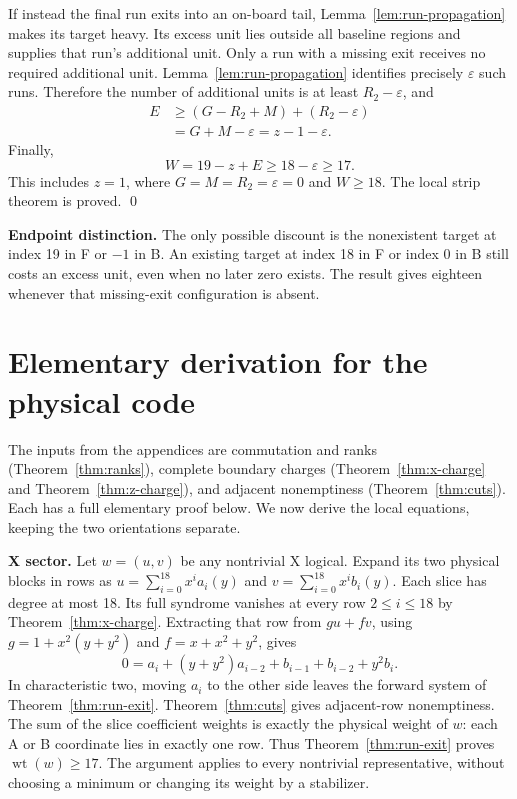 \documentclass{article}
\DeclareMathOperator{\wt}{wt}
\begin{document}
If instead the final run exits into an on-board tail, Lemma~\ref{lem:run-propagation} makes
its target heavy. Its excess unit lies outside all baseline regions and supplies
that run's additional unit. Only a run with a missing exit receives no
required additional unit. Lemma~\ref{lem:run-propagation} identifies precisely
\(\varepsilon\) such runs. Therefore the number of additional units is at least
\(R_2 - \varepsilon\), and
\begin{equation}
  \begin{aligned}
    E &\ge (G - R_2 + M) + (R_2 - \varepsilon) \\
      &= G + M - \varepsilon = z - 1 - \varepsilon.
  \end{aligned}
\end{equation}
Finally,
\begin{equation}
  W = 19 - z + E \ge 18 - \varepsilon \ge 17.
\end{equation}
This includes \(z = 1\), where \(G = M = R_2 = \varepsilon = 0\) and \(W \ge 18\).
The local strip theorem is proved. \qed

\textbf{Endpoint distinction.} The only possible discount is the nonexistent
target at index 19 in F or \(-1\) in B. An existing target at index 18 in F
or index 0 in B still costs an excess unit, even when no later zero exists.
The result gives eighteen whenever that missing-exit configuration is absent.

\section{Elementary derivation for the physical code}\label{sec:application}

The inputs from the appendices are commutation and ranks (Theorem~\ref{thm:ranks}),
complete boundary charges (Theorem~\ref{thm:x-charge} and Theorem~\ref{thm:z-charge}), and
adjacent nonemptiness (Theorem~\ref{thm:cuts}). Each has a full elementary proof below. We now
derive the local equations, keeping the two orientations separate.

\textbf{X sector.} Let \(w = (u,v)\) be any nontrivial X logical. Expand its two
physical blocks in rows as
\(u = \sum_{i=0}^{18} x^i a_i(y)\) and \(v = \sum_{i=0}^{18} x^i b_i(y)\).
Each slice has degree at most 18. Its full syndrome vanishes at every
row \(2 \le i \le 18\) by Theorem~\ref{thm:x-charge}. Extracting that row from
\(gu + fv\), using \(g = 1 + x^2 (y + y^2)\) and \(f = x + x^2 + y^2\), gives
\begin{equation}
  0 = a_i + (y + y^2) a_{i-2} + b_{i-1} + b_{i-2} + y^2 b_i.
\end{equation}
In characteristic two, moving \(a_i\) to the other side leaves the forward
system of Theorem~\ref{thm:run-exit}. Theorem~\ref{thm:cuts} gives adjacent-row nonemptiness.
The sum of the slice coefficient weights is exactly the physical weight of \(w\):
each A or B coordinate lies in exactly one row. Thus Theorem~\ref{thm:run-exit} proves
\(\wt(w) \ge 17\). The argument applies to every nontrivial representative,
without choosing a minimum or changing its weight by a stabilizer.
\end{document}
